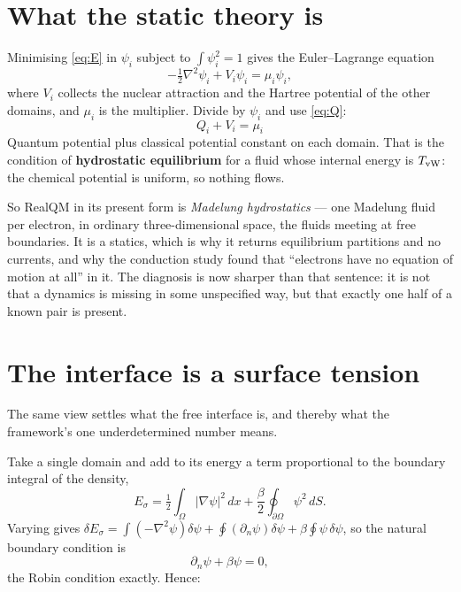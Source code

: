 \documentclass[11pt]{article}
\newcommand{\grad}{\nabla}
\newcommand{\half}{\tfrac12}
\begin{document}
\section{What the static theory is}

Minimising \eqref{eq:E} in $\psi_i$ subject to $\int\psi_i^2=1$ gives the Euler--Lagrange equation
\begin{equation}\label{eq:EL}
-\half\grad^2\psi_i+V_i\psi_i=\mu_i\psi_i,
\end{equation}
where $V_i$ collects the nuclear attraction and the Hartree potential of the other domains, and
$\mu_i$ is the multiplier. Divide by $\psi_i$ and use \eqref{eq:Q}:
\begin{equation}\label{eq:hydrostatic}
\boxed{\;Q_i+V_i=\mu_i\;}
\end{equation}
Quantum potential plus classical potential constant on each domain. That is the condition of
\textbf{hydrostatic equilibrium} for a fluid whose internal energy is $T_{\rm vW}$: the chemical
potential is uniform, so nothing flows.

So RealQM in its present form is \emph{Madelung hydrostatics} --- one Madelung fluid per electron, in
ordinary three-dimensional space, the fluids meeting at free boundaries. It is a statics, which is
why it returns equilibrium partitions and no currents, and why the conduction study found that
``electrons have no equation of motion at all'' in it. The diagnosis is now sharper than that
sentence: it is not that a dynamics is missing in some unspecified way, but that exactly one half of
a known pair is present.

\section{The interface is a surface tension}\label{sec:surface}

The same view settles what the free interface is, and thereby what the framework's one
underdetermined number means.

Take a single domain and add to its energy a term proportional to the boundary integral of the
density,
\begin{equation}\label{eq:surf}
E_\sigma=\half\int_\Omega|\grad\psi|^2\,dx+\frac{\beta}{2}\oint_{\partial\Omega}\psi^2\,dS .
\end{equation}
Varying gives $\delta E_\sigma=\int(-\grad^2\psi)\delta\psi
+\oint(\partial_n\psi)\delta\psi+\beta\oint\psi\,\delta\psi$, so the natural boundary condition is
\begin{equation}\label{eq:robin}
\partial_n\psi+\beta\psi=0,
\end{equation}
the Robin condition exactly. Hence:
\end{document}
